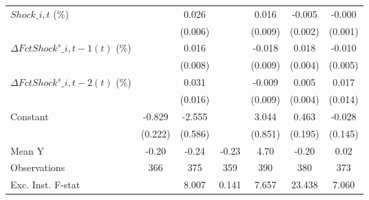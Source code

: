 {\begin{tabular}{l*{6}{c}}
\addlinespace
$ Shock\_{i,t}$ (\%) &                     &       0.026\sym{***}&                     &       0.016\sym{*}  &      -0.005\sym{**} &      -0.000         \\
                    &                     &     (0.006)         &                     &     (0.009)         &     (0.002)         &     (0.001)         \\
\addlinespace
$ \Delta FctShock^s\_{i,t-1}(t)$ (\%)&                     &       0.016\sym{**} &                     &      -0.018\sym{*}  &       0.018\sym{***}&      -0.010\sym{*}  \\
                    &                     &     (0.008)         &                     &     (0.009)         &     (0.004)         &     (0.005)         \\
\addlinespace
$ \Delta FctShock^s\_{i,t-2}(t)$ (\%)&                     &       0.031\sym{*}  &                     &      -0.009         &       0.005         &       0.017         \\
                    &                     &     (0.016)         &                     &     (0.009)         &     (0.004)         &     (0.014)         \\
\addlinespace
Constant            &      -0.829\sym{***}&      -2.555\sym{***}&                     &       3.044\sym{***}&       0.463\sym{**} &      -0.028         \\
                    &     (0.222)         &     (0.586)         &                     &     (0.851)         &     (0.195)         &     (0.145)         \\
\midrule
Mean Y              &       -0.20         &       -0.24         &       -0.23         &        4.70         &       -0.20         &        0.02         \\
Observations        &         366         &         375         &         359         &         390         &         380         &         373         \\
Exc. Inst. F-stat   &                     &       8.007         &       0.141         &       7.657         &      23.438         &       7.060         \\
\bottomrule
\end{tabular}
}
